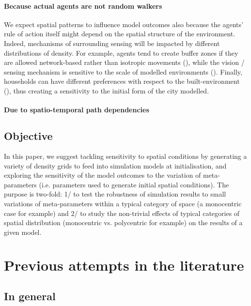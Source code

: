 \documentclass[11pt]{article}
\begin{document}
\paragraph{Because actual agents are not random walkers}
We expect spatial patterns to influence model outcomes also because the agents' rule of action itself might depend on the spatial structure of the environment. Indeed, mechanisms of surrounding sensing will be impacted by different distributions of density. For example, agents tend to create buffer zones if they are allowed network-based rather than isotropic movements (\cite{Banos2012}), while the vision / sensing mechanism is sensitive to the scale of modelled environments (\cite{LauriJaggi2003, FossettDietrich2009}). Finally, households can have different preferences with respect to the built-environment (\cite{SpielmanHarrison2014}), thus creating a sensitivity to the initial form of the city modelled.

\paragraph{Due to spatio-temporal path dependencies}

\subsection{Objective}

In this paper, we suggest tackling sensitivity to spatial conditions by generating a variety of density grids to feed into simulation models at initialisation, and exploring the sensitivity of the model outcomes to the variation of meta-parameters (i.e. parameters used to generate initial spatial conditions). The purpose is two-fold: 1/ to test the robustness of simulation results to small variations of meta-parameters within a typical category of space (a monocentric case for example) and 2/ to study the non-trivial effects of typical categories of spatial distribution (monocentric vs. polycentric for example) on the results of a given model.


\section{Previous attempts in the literature}

\subsection{In general}
\end{document}
